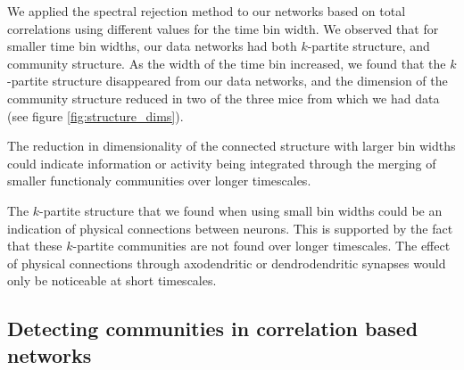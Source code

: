   We applied the spectral rejection method to our networks based on total correlations using different values for the time bin width. We observed that for smaller time bin widths, our data networks had both $k$-partite structure, and community structure. As the width of the time bin increased, we found that the $k$-partite structure disappeared from our data networks, and the dimension of the community structure reduced in two of the three mice from which we had data (see figure \ref{fig:structure_dims}).

  The reduction in dimensionality of the connected structure with larger bin widths could indicate information or activity being integrated through the merging of smaller functionaly communities over longer timescales.

  The $k$-partite structure that we found when using small bin widths could be an indication of physical connections between neurons. This is supported by the fact that these $k$-partite communities are not found over longer timescales. The effect of physical connections through axodendritic or dendrodendritic synapses would only be noticeable at short timescales.

  \subsection{Detecting communities in correlation based networks}

